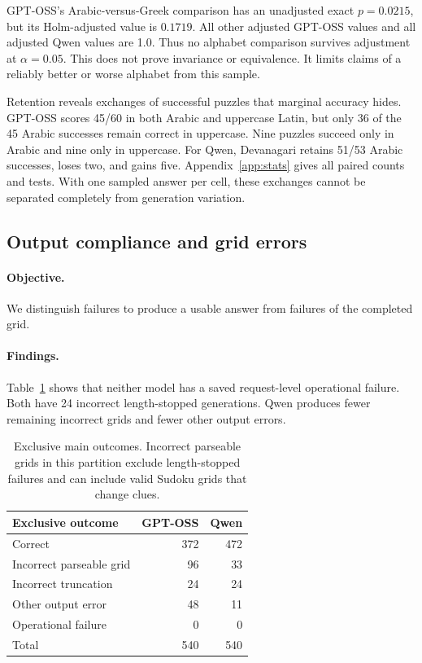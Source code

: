 \documentclass[11pt]{article}
\begin{document}
GPT-OSS's Arabic-versus-Greek comparison has an unadjusted exact $p=0.0215$, but its Holm-adjusted value is $0.1719$. All other adjusted GPT-OSS values and all adjusted Qwen values are 1.0. Thus no alphabet comparison survives adjustment at $\alpha=0.05$. This does not prove invariance or equivalence. It limits claims of a reliably better or worse alphabet from this sample.

Retention reveals exchanges of successful puzzles that marginal accuracy hides. GPT-OSS scores 45/60 in both Arabic and uppercase Latin, but only 36 of the 45 Arabic successes remain correct in uppercase. Nine puzzles succeed only in Arabic and nine only in uppercase. For Qwen, Devanagari retains 51/53 Arabic successes, loses two, and gains five. Appendix~\ref{app:stats} gives all paired counts and tests. With one sampled answer per cell, these exchanges cannot be separated completely from generation variation.

\subsection{Output compliance and grid errors}
\paragraph{Objective.} We distinguish failures to produce a usable answer from failures of the completed grid.
\paragraph{Findings.} Table~\ref{tab:errors} shows that neither model has a saved request-level operational failure. Both have 24 incorrect length-stopped generations. Qwen produces fewer remaining incorrect grids and fewer other output errors.

\begin{table}[t]
\centering\small
\begin{tabular}{lrr}
\toprule
Exclusive outcome & GPT-OSS & Qwen\\
\midrule
Correct & 372 & 472\\
Incorrect parseable grid & 96 & 33\\
Incorrect truncation & 24 & 24\\
Other output error & 48 & 11\\
Operational failure & 0 & 0\\
\midrule
Total & 540 & 540\\
\bottomrule
\end{tabular}
\caption{Exclusive main outcomes. Incorrect parseable grids in this partition exclude length-stopped failures and can include valid Sudoku grids that change clues.}
\label{tab:errors}
\end{table}
\end{document}
